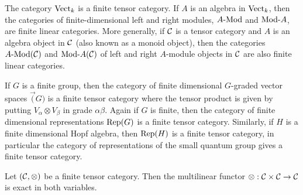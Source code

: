 \documentclass{amsart}
\begin{document}

\begin{example}
	The category $\mathrm{Vect}_k$ is a finite tensor category. If $A$ is an algebra in $\mathrm{Vect}_k$, then the categories of finite-dimensional left and right modules, $\Mod{A}{}$ and $\Mod{}{A}$, are finite linear categories. More generally, if $\mathcal C$ is a tensor category and $A$ is an algebra object in $\mathcal C$ (also known as a monoid object), then the categories $\Mod{A}{}(\cC)$ and $\Mod{}{A}(\cC)$ of left and right $A$-module objects in $\mathcal C$ are also finite linear categories.
\end{example}

\begin{example}
If $G$ is a finite group, then the category of finite dimensional $G$-graded vector spaces $\Vec(G)$ is a finite tensor category where the tensor product is given by putting $V_\alpha \otimes V_\beta$ in grade $\alpha \beta$.  Again if $G$ is finite, then the category of finite dimensional representations $\mathrm{Rep}(G)$ is a finite tensor category.  Similarly, if $H$ is a finite dimensional Hopf algebra, then $\mathrm{Rep}(H)$ is a finite tensor category, in particular the category of representations of the small quantum group gives a finite tensor category.
\end{example}


\begin{lemma} \cite[2.1.8]{MR1797619} \cite[Prop. 1.13.1]{EGNO}  \label{lma:RigidIsExact}
	Let $(\mathcal C, \otimes)$ be a finite tensor category. Then the multilinear functor $\otimes: \mathcal C \times \mathcal C \to \mathcal C$ is exact in both variables. 
\end{lemma}
\end{document}
